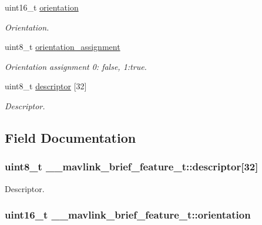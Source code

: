 \begin{DoxyCompactItemize}
uint16\+\_\+t \hyperlink{struct____mavlink__brief__feature__t_adc9c6a6638b0495569f7301c75aacac5}{orientation}
\begin{DoxyCompactList}\small\item\em Orientation. \end{DoxyCompactList}\item 
uint8\+\_\+t \hyperlink{struct____mavlink__brief__feature__t_acac2124a4903d5985747b5b2a05560ae}{orientation\+\_\+assignment}
\begin{DoxyCompactList}\small\item\em Orientation assignment 0\+: false, 1\+:true. \end{DoxyCompactList}\item 
uint8\+\_\+t \hyperlink{struct____mavlink__brief__feature__t_aad2a158c8177d19bbd733765e1cac8e0}{descriptor} \mbox{[}32\mbox{]}
\begin{DoxyCompactList}\small\item\em Descriptor. \end{DoxyCompactList}\end{DoxyCompactItemize}


\subsection{Field Documentation}
\hypertarget{struct____mavlink__brief__feature__t_aad2a158c8177d19bbd733765e1cac8e0}{
\subsubsection[{descriptor}]{\setlength{\rightskip}{0pt plus 5cm}uint8\+\_\+t \+\_\+\+\_\+mavlink\+\_\+brief\+\_\+feature\+\_\+t\+::descriptor\mbox{[}32\mbox{]}}}\label{struct____mavlink__brief__feature__t_aad2a158c8177d19bbd733765e1cac8e0}


Descriptor. 

\hypertarget{struct____mavlink__brief__feature__t_adc9c6a6638b0495569f7301c75aacac5}{
\subsubsection[{orientation}]{\setlength{\rightskip}{0pt plus 5cm}uint16\+\_\+t \+\_\+\+\_\+mavlink\+\_\+brief\+\_\+feature\+\_\+t\+::orientation}}\label{struct____mavlink__brief__feature__t_adc9c6a6638b0495569f7301c75aacac5}


